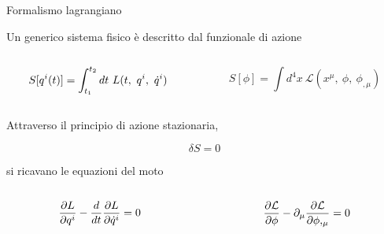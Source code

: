 \begin{frame}{Formalismo lagrangiano}
    
    Un generico sistema fisico è descritto dal funzionale di azione

    \begin{columns}
    \begin{column}{0.5\textwidth}
       \begin{equation*}
            S[q^i(t)] = \int_{t_1}^{t_2}dt~ L(t, ~q^i, ~\dot q^i)
       \end{equation*} 
    \end{column}
    \begin{column}{0.5\textwidth}
       \begin{equation*}
            S[\phi] = \int d^4 x ~ \mathcal L (x^\mu,~\phi,~\phi_{, \mu})
       \end{equation*}
    \end{column}
    \end{columns}

    Attraverso il principio di azione stazionaria,

    \begin{equation*}
        \delta S = 0
   \end{equation*}

    si ricavano le equazioni del moto 

    \begin{columns}
        \begin{column}{0.5\textwidth}
           \begin{equation*}
                \frac{\partial L}{\partial q^i} - \frac{d}{dt} \frac{\partial L}{\partial\dot q^i} = 0
           \end{equation*} 
        \end{column}
        \begin{column}{0.5\textwidth}
           \begin{equation*}
                \frac{\partial\mathcal L}{\partial\phi} - \partial_\mu \frac{\partial\mathcal L}{\partial\phi,_\mu} = 0
           \end{equation*}
        \end{column}
        \end{columns}
\end{frame}

